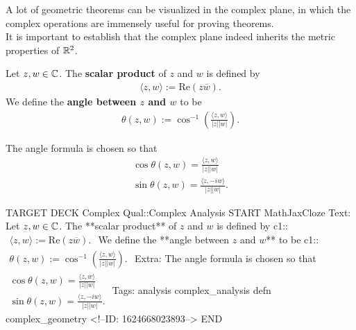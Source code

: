 \documentclass{memoir}
\begin{document}
A lot of geometric theorems can be visualized in the complex plane, in which the complex operations are immensely useful for proving theorems.\\

It is important to establish that the complex plane indeed inherits the metric properties of \(\mathbb{R}^2\).

\begin{defn}
	Let \(z,w \in \mathbb{C}\). The \textbf{scalar product} of \(z\) and \(w\) is defined by
	\begin{align*}
		\langle z,w \rangle := \textrm{Re}(z \overline{w}).
	\end{align*}
	We define the \textbf{angle between \(z\) and \(w\)} to be
	\begin{align*}
		\theta (z,w):= \cos ^{-1} \left( \frac{\langle z, w \rangle }{\left| z \right| \left| w \right| } \right) .
	\end{align*}
\end{defn}
The angle formula is chosen so that
\begin{align*}
	\cos \theta (z,w) = \frac{\langle z,w \rangle }{\left| z \right| \left| w \right| }\\
	\sin\theta (z,w) = \frac{\langle z, -iw \rangle }{\left| z \right| \left| w \right| }.
\end{align*}

\begin{anki}
TARGET DECK
Complex Qual::Complex Analysis
START
MathJaxCloze
Text: Let \(z,w \in \mathbb{C}\). The **scalar product** of \(z\) and \(w\) is defined by
 {{c1::\(\begin{align*}
         	\langle z,w \rangle := \textrm{Re}(z \overline{w}).
         \end{align*}\)}} 
	We define the **angle between \(z\) and \(w\)** to be
	 {{c1::\(\begin{align*}
	         	\theta (z,w):= \cos ^{-1} \left( \frac{\langle z, w \rangle }{\left| z \right| \left| w \right| } \right) .
	         \end{align*}\)}} 
Extra: The angle formula is chosen so that
\(\begin{align*}
  	\cos \theta (z,w) = \frac{\langle z,w \rangle }{\left| z \right| \left| w \right| }\\
  	\sin\theta (z,w) = \frac{\langle z, -iw \rangle }{\left| z \right| \left| w \right| }.
  \end{align*}\)
Tags: analysis complex_analysis defn complex_geometry
<!--ID: 1624668023893-->
END
\end{anki}
\end{document}
